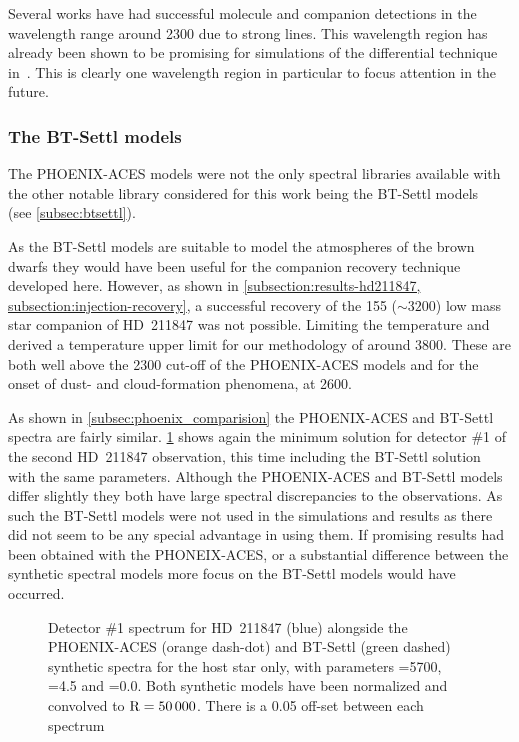 Several works \citet[e.g.][]{brogi_carbon_2014, brogi_rotation_2016, piskorz_evidence_2016} have had successful molecule and companion detections in the wavelength range around 2300\nm{} due to strong  lines.
This wavelength region has already been shown to be promising for simulations of the differential technique in~\citet{kostogryz_spectral_2013}.
This is clearly one wavelength region in particular to focus attention in the future.


\subsubsection{The {BT-Settl} models}
\label{subsubsec:bt-settl}
The {PHOENIX-ACES} models were not the only spectral libraries available with the other notable library considered for this work being the {BT-Settl} models~\citep{allard_model_2010,allard_btsettl_2013,baraffe_new_2015} (see \cref{subsec:btsettl}).

As the {BT-Settl} models are suitable to model the atmospheres of the brown dwarfs they would have been useful for the companion recovery technique developed here.
However, as shown in \cref{subsection:results-hd211847, subsection:injection-recovery}, a successful recovery of the 155\Mjup{} (\Teff{}\(\sim3200\)\K{}) low mass star companion of {HD~211847} was not possible.
Limiting the temperature and derived a temperature upper limit for \textrm{our} methodology of around 3800\K{}.
These are both well above the 2300\K{} cut-off of the {PHOENIX-ACES} models and for the onset of dust- and cloud-formation phenomena, at 2600\K{}.

As shown in \cref{subsec:phoenix_comparision} the {PHOENIX-ACES} and {BT-Settl} spectra are fairly similar.
\cref{fig:hd211847-models} shows again the minimum \textchisquared{} solution for detector \#1 of the second {HD~211847} observation, this time including the {BT-Settl} solution with the same parameters.
Although the {PHOENIX-ACES} and {BT-Settl} models differ slightly they both have large spectral discrepancies to the observations.
As such the {BT-Settl} models were not used in the \textchisquared{} simulations and results as there did not seem to be any special advantage in using them.
If promising results had been obtained with the {PHONEIX-ACES}, or a substantial difference between the synthetic spectral models more focus on the {BT-Settl} models would have occurred.


\begin{figure}
    \centering
    \caption{Detector \#1 spectrum for {HD~211847} (blue) alongside the {PHOENIX-ACES} (orange dash-dot) and {BT-Settl} (green dashed) synthetic spectra for the host star only, with parameters \Teff{}=5700\K{}, \Logg{}=4.5 and \feh{}=0.0.
        Both synthetic models have been normalized and convolved to \(\rm R=50\,000\).
        There is a 0.05 off-set between each spectrum}
    \label{fig:hd211847-models}
\end{figure}



